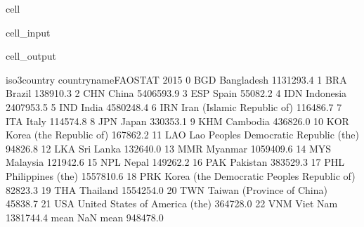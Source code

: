 \documentclass[letterpaper,10pt,english]{jupyterBook}
\begin{document}
\begin{sphinxuseclass}{cell}\begin{sphinxVerbatimInput}

\begin{sphinxuseclass}{cell_input}
\begin{sphinxVerbatim}[commandchars=\\\{\}]
\end{sphinxVerbatim}

\end{sphinxuseclass}\end{sphinxVerbatimInput}
\begin{sphinxVerbatimOutput}

\begin{sphinxuseclass}{cell_output}
\begin{sphinxVerbatim}[commandchars=\\\{\}]
     iso3\PYGZus{}country                         country\PYGZus{}name\PYGZus{}FAOSTAT       2015  \PYGZbs{}
0             BGD                                   Bangladesh  1131293.4   
1             BRA                                       Brazil   138910.3   
2             CHN                                        China  5406593.9   
3             ESP                                        Spain    55082.2   
4             IDN                                    Indonesia  2407953.5   
5             IND                                        India  4580248.4   
6             IRN                   Iran (Islamic Republic of)   116486.7   
7             ITA                                        Italy   114574.8   
8             JPN                                        Japan   330353.1   
9             KHM                                     Cambodia   436826.0   
10            KOR                      Korea (the Republic of)   167862.2   
11            LAO       Lao People\PYGZsq{}s Democratic Republic (the)    94826.8   
12            LKA                                    Sri Lanka   132640.0   
13            MMR                                      Myanmar  1059409.6   
14            MYS                                     Malaysia   121942.6   
15            NPL                                        Nepal   149262.2   
16            PAK                                     Pakistan   383529.3   
17            PHL                            Philippines (the)  1557810.6   
18            PRK  Korea (the Democratic People\PYGZsq{}s Republic of)    82823.3   
19            THA                                     Thailand  1554254.0   
20            TWN                   Taiwan (Province of China)    45838.7   
21            USA               United States of America (the)   364728.0   
22            VNM                                     Viet Nam  1381744.4   
mean          NaN                                         mean   948478.0   


\end{sphinxVerbatim}
\end{sphinxuseclass}
\end{sphinxVerbatimOutput}
\end{sphinxuseclass}
\end{document}
